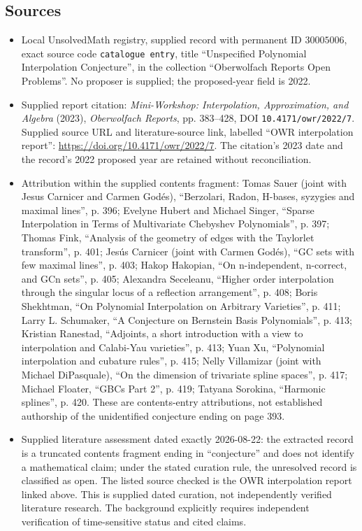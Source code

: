\documentclass[11pt]{article}
\begin{document}
\subsection{Sources}
\begin{itemize}
\item Local UnsolvedMath registry, supplied record with permanent ID \(30005006\), exact source code \texttt{catalogue entry}, title ``Unspecified Polynomial Interpolation Conjecture'', in the collection ``Oberwolfach Reports Open Problems''. No proposer is supplied; the proposed-year field is 2022.
\item Supplied report citation: \emph{Mini-Workshop: Interpolation, Approximation, and Algebra} (2023), \emph{Oberwolfach Reports}, pp. 383--428, DOI \texttt{10.4171/owr/2022/7}. Supplied source URL and literature-source link, labelled ``OWR interpolation report'': \url{https://doi.org/10.4171/owr/2022/7}. The citation's 2023 date and the record's 2022 proposed year are retained without reconciliation.
\item Attribution within the supplied contents fragment: Tomas Sauer (joint with Jesus Carnicer and Carmen Godés), ``Berzolari, Radon, H-bases, syzygies and maximal lines'', p. 396; Evelyne Hubert and Michael Singer, ``Sparse Interpolation in Terms of Multivariate Chebyshev Polynomials'', p. 397; Thomas Fink, ``Analysis of the geometry of edges with the Taylorlet transform'', p. 401; Jesús Carnicer (joint with Carmen Godés), ``GC sets with few maximal lines'', p. 403; Hakop Hakopian, ``On n-independent, n-correct, and GCn sets'', p. 405; Alexandra Seceleanu, ``Higher order interpolation through the singular locus of a reflection arrangement'', p. 408; Boris Shekhtman, ``On Polynomial Interpolation on Arbitrary Varieties'', p. 411; Larry L. Schumaker, ``A Conjecture on Bernstein Basis Polynomials'', p. 413; Kristian Ranestad, ``Adjoints, a short introduction with a view to interpolation and Calabi-Yau varieties'', p. 413; Yuan Xu, ``Polynomial interpolation and cubature rules'', p. 415; Nelly Villamizar (joint with Michael DiPasquale), ``On the dimension of trivariate spline spaces'', p. 417; Michael Floater, ``GBCs Part 2'', p. 419; Tatyana Sorokina, ``Harmonic splines'', p. 420. These are contents-entry attributions, not established authorship of the unidentified conjecture ending on page 393.
\item Supplied literature assessment dated exactly 2026-08-22: the extracted record is a truncated contents fragment ending in ``conjecture'' and does not identify a mathematical claim; under the stated curation rule, the unresolved record is classified as open. The listed source checked is the OWR interpolation report linked above. This is supplied dated curation, not independently verified literature research. The background explicitly requires independent verification of time-sensitive status and cited claims.
\end{itemize}
\end{document}
